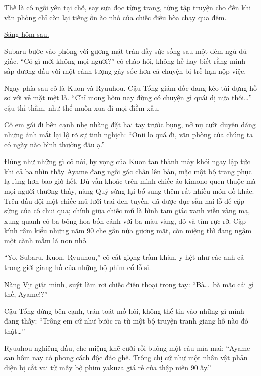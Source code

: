 \documentclass[../main.tex]{subfiles}
\begin{document}
Thế là cô ngồi yên tại chỗ, say sưa đọc từng trang, từng tập truyện cho đến khi văn phòng chỉ còn lại tiếng ồn ào nhỏ của chiếc điều hòa chạy qua đêm.

\begin{center}
  \uline{Sáng hôm sau.}
\end{center}

Subaru bước vào phòng với gương mặt tràn đầy sức sống sau một đêm ngủ đủ giấc. ``Có gì mới không mọi người?'' cô chào hỏi, không hề hay biết rằng mình sắp đương đầu với một cảnh tượng gây sốc hơn cả chuyện bị trễ hạn nộp việc.

Ngay phía sau cô là Kuon và Ryuuhou. Cậu Tổng giám đốc đang kéo túi đựng hồ sơ với vẻ mặt mệt lả. ``Chỉ mong hôm nay đừng có chuyện gì quái dị nữa thôi\dots'' cậu thì thầm, như thể muốn xua đi mọi điềm xấu.

Cô em gái đi bên cạnh nhẹ nhàng đặt hai tay trước bụng, nở nụ cười duyên dáng nhưng ánh mắt lại lộ rõ sự tinh nghịch: ``Onii lo quá đi, văn phòng của chúng ta có ngày nào bình thường đâu ạ.''

Đúng như những gì cô nói, hy vọng của Kuon tan thành mây khói ngay lập tức khi cả ba nhìn thấy Ayame đang ngồi gác chân lên bàn, mặc một bộ trang phục lạ lùng hơn bao giờ hết. Dù vẫn khoác trên mình chiếc áo kimono quen thuộc mà mọi người thường thấy, nàng Quỷ sừng lại bổ sung thêm rất nhiều món đồ khác. Trên đầu đội một chiếc mũ lưỡi trai đen tuyền, đã được đục sẵn hai lỗ để cặp sừng của cô chui qua; chính giữa chiếc mũ là hình tam giác xanh viền vàng mạ, xung quanh có ba bông hoa bốn cánh với ba màu vàng, đỏ và tím rực rỡ. Cặp kính râm kiểu những năm 90 che gần nửa gương mặt, còn miệng thì đang ngậm một cành mầm lá non nhỏ.

``Yo, Subaru, Kuon, Ryuuhou,'' cô cất giọng trầm khàn, y hệt như các anh cả trong giới giang hồ của những bộ phim cổ lỗ sĩ.


Nàng Vịt giật mình, suýt làm rơi chiếc điện thoại trong tay: ``Bà\dots\ bà mặc cái gì thế, Ayame!?''

Cậu Tổng đứng bên cạnh, trán toát mồ hôi, không thể tin vào những gì mình đang thấy: ``Trông em cứ như bước ra từ một bộ truyện tranh giang hồ nào đó thật\dots''

Ryuuhou nghiêng đầu, che miệng khẽ cười rồi buông một câu mỉa mai: ``Ayame-san hôm nay có phong cách độc đáo ghê. Trông chị cứ như một nhân vật phản diện bị cắt vai từ mấy bộ phim yakuza giá rẻ của thập niên 90 ấy.''
\end{document}

